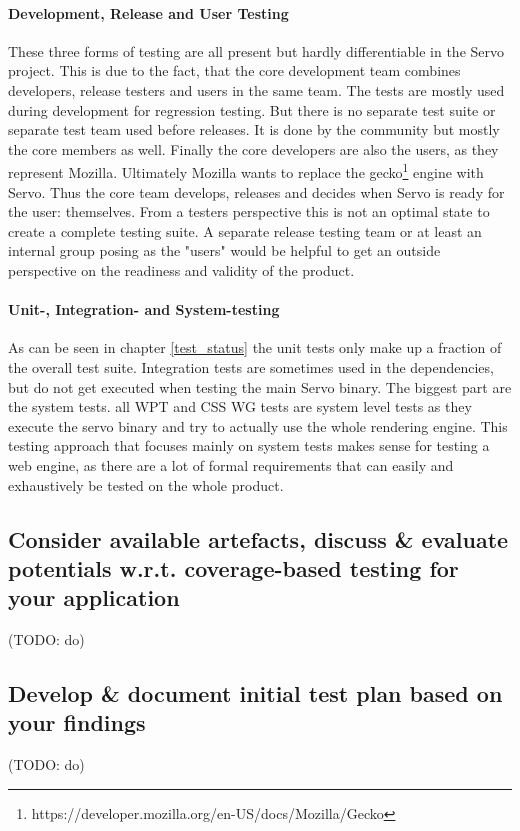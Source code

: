 \documentclass{scrartcl}
\newcommand{\todo}[1] {{\color{red}(TODO: #1)}}
\begin{document}
\paragraph{Development, Release and User Testing}
These three forms of testing are all present but hardly differentiable in the Servo project. This is due to the fact, that the core development team combines developers, release testers and users in the same team. The tests are mostly used during development for regression testing. But there is no separate test suite or separate test team used before releases. It is done by the community but mostly the core members as well. Finally the core developers are also the users, as they represent Mozilla. Ultimately Mozilla wants to replace the gecko\footnote{https://developer.mozilla.org/en-US/docs/Mozilla/Gecko} engine with Servo. Thus the core team develops, releases and decides when Servo is ready for the user: themselves. From a testers perspective this is not an optimal state to create a complete testing suite. A separate release testing team or at least an internal group posing as the "users" would be helpful to get an outside perspective on the readiness and validity of the product.

\paragraph{Unit-, Integration- and System-testing}
As can be seen in chapter \ref{test_status} the unit tests only make up a fraction of the overall test suite. Integration tests are sometimes used in the dependencies, but do not get executed when testing the main Servo binary. The biggest part are the system tests. all WPT and CSS WG tests are system level tests as they execute the servo binary and try to actually use the whole rendering engine. This testing approach that focuses mainly on system tests makes sense for testing a web engine, as there are a lot of formal requirements that can easily and exhaustively be tested on the whole product.

\subsection{Consider available artefacts, discuss \& evaluate potentials w.r.t. coverage-based testing for your application}
\todo{do}

\subsection{Develop \& document initial test plan based on your findings}
\todo{do}
\end{document}
